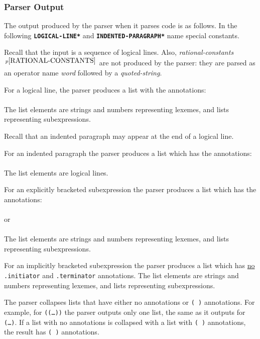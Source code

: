 \documentclass[12pt]{article}
\newcommand{\ttkey}[1]{{\tt \bfseries #1}}
\newcommand{\pagnote}[1]{$\,^{p\pageref{#1}}$}
\begin{document}
\subsubsection{Parser Output}
\label{PARSER-OUTPUT}

The output produced by the parser when it parses code is as
follows.  In the following \ttkey{*LOGICAL-LINE*} and
\ttkey{*INDENTED-PARAGRAPH*} name special constants.

Recall that the input is a sequence of logical lines.  Also,
{\em rational-constants}\pagnote{RATIONAL-CONSTANTS}
are not produced by the parser: they are parsed as an operator
name {\em word} followed by a {\em quoted-string}.

For a logical line, the parser produces a list with the
annotations: \\
\hspace*{0.5in}{\tt ".initiator" => *LOGICAL-LINE*, ".terminator" => "<LF>"} \\
The list elements are strings and numbers representing lexemes, and
lists representing subexpressions.

Recall that an indented paragraph may appear at the end of a logical line.

For an indented paragraph the parser produces a list
which has the annotations: \\
\hspace*{0.5in}{\tt ".initiator" => ":",
                    ".terminator" => *INDENTED-PARAGRAPH*} \\
The list elements are logical lines.

For an explicitly bracketed subexpression the parser produces a list which has
the annotations: \\
\hspace*{0.5in}{\tt ".initiator" => "(", ".terminator" => ")"} \\
or \\
\hspace*{0.5in}{\tt ".initiator" => "[", ".terminator" => "]"} \\
The list elements are strings and numbers representing lexemes, and
lists representing subexpressions.

For an implicitly bracketed subexpression the parser produces a list which has
\underline{no} {\tt .initiator} and {\tt .terminator} annotations.
The list elements are strings and numbers representing lexemes, and
lists representing subexpressions.

The parser collapses lists that have either no annotations or {\tt (~)}
annotations.  For example, for {\tt ((\ldots))} the parser outputs
only one list, the same as it outputs for {\tt (\ldots)}.  If a list
with no annotations is collapsed with a list with {\tt (~)} annotations,
the result has {\tt (~)} annotations.
\end{document}
